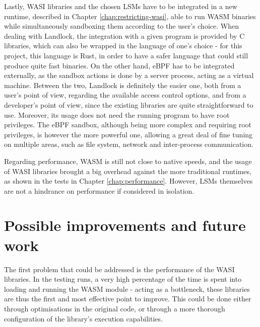 Lastly, WASI libraries and the chosen LSMs have to be integrated in a new runtime, described in
Chapter \ref{chap:restricting-wasi}, able to run WASM binaries while simultaneously sandboxing them according to the user's choice.
When dealing with Landlock, the integration with a given program is provided by C libraries,
which can also be wrapped in the language of one's choice - for this project, this language is Rust,
in order to have a safer language that could still produce quite fast binaries.
On the other hand, eBPF has to be integrated externally, as the sandbox actions is done by
a server process, acting as a virtual machine.
Between the two, Landlock is definitely the easier one, both from a user's point of view,
regarding the available access control options, and from a developer's point of view, since
the existing libraries are quite straightforward to use. Moreover, its usage does not need the running program
to have root privileges.
The eBPF sandbox, although being more complex and requiring root privileges, is however
the more powerful one, allowing a great deal of fine tuning on multiple areas,
such as file system, network and inter-process communication.

Regarding performance, WASM is still not close to native speeds, and the usage of WASI libraries
brought a big overhead against the more traditional runtimes, as shown in the tests in Chapter \ref{chap:performance}.
However, LSMs themselves are not a hindrance on performance if considered in isolation.

\section{Possible improvements and future work}

The first problem that could be addressed is the performance of the WASI libraries.
In the testing runs, a very high percentage of the time is spent into loading and running the WASM module -
acting as a bottleneck, these libraries are thus the first and most effective point to improve.
This could be done either through optimisations in the original code, or through a more thorough
configuration of the library's execution capabilities.

